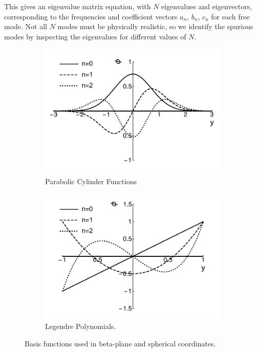 This gives an eigenvalue matrix equation, with $N$ eigenvalues and eigenvectors, corresponding to the frequencies and coefficient vectors $a_{n}$, $b_{n}$, $c_{n}$ for each free mode. Not all $N$ modes must be physically realistic, so we identify the spurious modes by inspecting the eigenvalues for different values of $N$.


\begin{figure}
  \centering
  \begin{subfigure}[b]{0.4\textwidth}
    \includegraphics[width=\textwidth]{figures/appendices/hermite-functions.pdf}
    \caption{Parabolic Cylinder Functions}\label{fig:hermite-functions}
  \end{subfigure}
  \begin{subfigure}[b]{0.4\textwidth}
    \includegraphics[width=\textwidth]{figures/appendices/legendre-polynomials.pdf}
    \caption{Legendre Polynomials.}\label{fig:legendre-polynomials}
  \end{subfigure}
\caption{Basis functions used in beta-plane and spherical coordinates.}\label{fig:basis-functions}
\end{figure}


